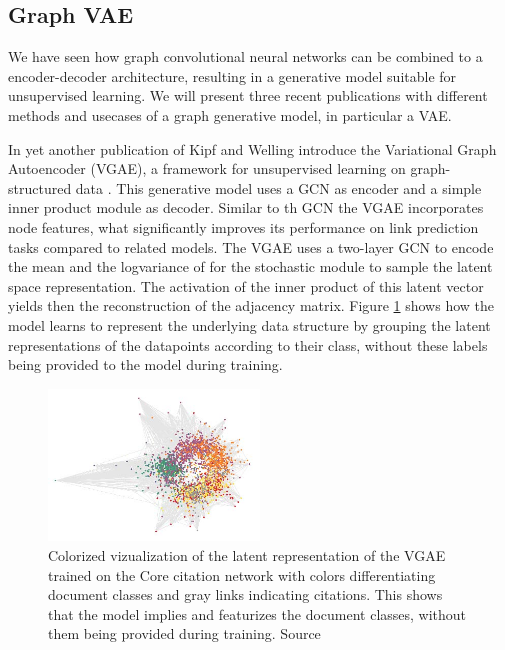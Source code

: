 \subsection{Graph VAE}
We have seen how graph convolutional neural networks can be combined to a encoder-decoder architecture, resulting in a generative model suitable for unsupervised learning. We will present three recent publications with different methods and usecases of a graph generative model, in particular a VAE.

In yet another publication of Kipf and Welling introduce the Variational Graph Autoencoder (VGAE), a framework for unsupervised learning on graph-structured data \cite{kipf_variational_2016}. This generative model uses a GCN as encoder and a simple inner product module as decoder. Similar to th GCN the VGAE incorporates node features, what significantly improves its performance on link prediction tasks compared to related models. The VGAE uses a two-layer GCN to encode the mean and the logvariance of for the stochastic module to sample the latent space representation. The activation of the inner product of this latent vector yields then the reconstruction of the adjacency matrix. Figure \ref{fig:kipfGVAE} shows how the model learns to represent the underlying data structure by grouping the latent representations of the datapoints according to their class, without these labels being provided to the model during training.

\begin{figure}[h]
    \centering
    \includegraphics[width=0.5\textwidth]{data/images/KipGVAE.jpg}
    \caption{Colorized vizualization of the latent representation of the VGAE trained on the Core citation network with colors differentiating document classes and gray links indicating citations. This shows that the model implies and featurizes the document classes, without them being provided during training. Source \cite{kipf_variational_2016}}
    \label{fig:kipfGVAE}
\end{figure}

